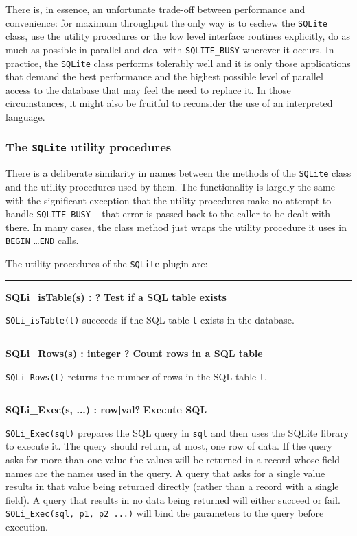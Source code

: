 There is, in essence, an unfortunate trade-off between performance and
convenience: for maximum throughput the only way is to eschew the
\texttt{SQLite} class, use the utility procedures or the low level interface
routines explicitly, do as much as possible in parallel and deal with
\texttt{SQLITE\_BUSY} wherever it occurs.  In practice, the \texttt{SQLite}
class performs tolerably well and it is only those applications that demand the
best performance and the highest possible level of parallel access to the
database that may feel the need to replace it. In those circumstances, it
might also be fruitful to reconsider the use of an interpreted language.

\subsubsection{The \texttt{SQLite} utility procedures}
There is a deliberate similarity in names between the methods of the
\texttt{SQLite} class and the utility procedures used by them. The functionality
is largely the same with the significant exception that the utility procedures
make no attempt to handle \texttt{SQLITE\_BUSY} -- that error is passed back
to the caller to be dealt with there. In many cases, the class method just
wraps the utility procedure it uses in \texttt{BEGIN} \ldots \texttt{END} calls.

The utility procedures of the \texttt{SQLite} plugin are:
\bigskip\hrule\vspace{0.1cm}
\noindent
{\bf SQLi\_isTable(s) :  ? } \hfill {\bf Test if a SQL table exists}

\noindent
\texttt{SQLi\_isTable(t)} succeeds if the SQL table \texttt{t} exists in the database.

\bigskip\hrule\vspace{0.1cm}
\noindent
{\bf SQLi\_Rows(s) : integer ? } \hfill {\bf Count rows in a SQL table}

\noindent
\texttt{SQLi\_Rows(t)} returns the number of rows in the SQL table \texttt{t}.

\bigskip\hrule\vspace{0.1cm}
\noindent
{\bf SQLi\_Exec(s, ...) : row|val? } \hfill {\bf Execute SQL}

\noindent
\texttt{SQLi\_Exec(sql)} prepares the SQL query in \texttt{sql} and then uses
the SQLite library to execute it. The query should return, at most, one row of
data.  If the query asks for more than one value the values will be returned in
a record whose field names are the names used in the query. A query that asks for a
single value results in that value being returned directly (rather than a record
with a single field). A query that results in no data being returned will either
succeed or fail.  \texttt{SQLi\_Exec(sql, p1, p2 ...)}  will bind the parameters
to the query before execution.

